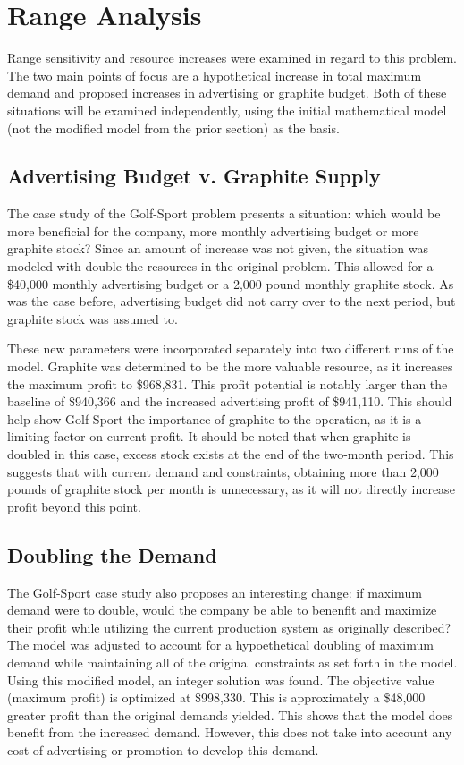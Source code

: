 \documentclass{article}
\begin{document}
\section{Range Analysis}
Range sensitivity and resource increases were examined in regard to this problem.  The two main points of focus are a hypothetical increase in total maximum demand and proposed increases in advertising or graphite budget.  Both of these situations 
will be examined independently, using the initial mathematical model (not the modified model from the prior section) as the basis.
\subsection{Advertising Budget v. Graphite Supply}
The case study of the Golf-Sport problem presents a situation:  which would be more beneficial for the company, more monthly advertising budget or more graphite stock?  Since an amount of increase was not given, the situation was modeled with double the resources in the original problem.  
This allowed for a \$40,000 monthly advertising budget or a 2,000 pound monthly graphite stock.  As was the case before, advertising budget did not carry over to the next period, but graphite stock was assumed to.
\par
These new parameters were incorporated separately into two different runs of the model.  Graphite was determined to be the more valuable resource, as it increases the maximum profit to \$968,831.  This profit potential is notably larger than the baseline of \$940,366 and the increased advertising 
profit of \$941,110.  This should help show Golf-Sport the importance of graphite to the operation, as it is a limiting factor on current profit.  It should be noted that when graphite is doubled in this case, excess stock exists at the end of the two-month period.  This suggests that with current demand and constraints, obtaining more than 2,000 pounds of graphite stock per month is unnecessary, 
as it will not directly increase profit beyond this point.
\subsection{Doubling the Demand}
The Golf-Sport case study also proposes an interesting change:  if maximum demand were to double, would the company be able to benenfit and maximize their profit while utilizing the current production system as originally described?  The model was adjusted to account for a hypoethetical doubling of maximum demand while maintaining all of the original constraints as set forth in the model.  
Using this modified model, an integer solution was found.  The objective value (maximum profit) is optimized at \$998,330.  This is approximately a \$48,000 greater profit than the original demands yielded.  This shows that the model does benefit from the increased demand.  However, this does not take into account any cost of advertising or promotion to develop this demand.
\end{document}
